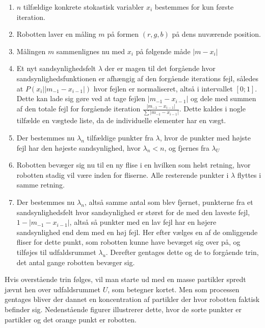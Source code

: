 \documentclass[../../SRP.tex]{subfiles}
\begin{document}
\begin{enumerate}
  \item $n$ tilfældige konkrete stokastisk variabler $x_i$ bestemmes for kun første iteration.

  \item Robotten laver en måling $m$ på formen $(r,g,b)$ på dens nuværende position.

  \item Målingen $m$ sammenlignes nu med $x_i$ på følgende måde $|m - x_i|$

  \item Et nyt sandsynlighedsfelt $\lambda$ der er magen til det forgående hvor sandsynlighedsfunktionen er afhængig af den forgående iterations fejl, således at $P(x_i | |m_{-1} - x_{i-1}|)$ hvor fejlen er normaliseret, altså i intervallet $[0;1]$. Dette kan lade sig gøre ved at tage fejlen $|m_{-1} - x_{i-1}|$ og dele med summen af den totale fejl for forgående iteration $\frac{|m_{-1} - x_{i-1}|}{\sum |m_{-1} - x_{i-1}|}$. Dette kaldes i nogle tilfælde en vægtede liste, da de individuelle elementer har en vægt. 

  \item Der bestemmes nu $\lambda_n$ tilfældige punkter fra $\lambda$, hvor de punkter med højste fejl har den højeste sandsynlighed, hvor $\lambda_n < n$, og fjernes fra $\lambda_U$

  \item Robotten bevæger sig nu til en ny flise i en hvilken som helst retning, hvor robotten stadig vil være inden for fliserne. Alle resterende punkter i $\lambda$ flyttes i samme retning.

  \item Der bestemmes nu $\lambda_n$, altså samme antal som blev fjernet, punkterne fra et sandsynlighedsfelt hvor sandsynlighed er størst for de med den laveste fejl, $1-|m_{-1} - x_{i-1}|$, altså så punkter med en lav fejl har en højere sandsynlighed end dem med en høj fejl. Her efter vælges en af de omliggende fliser for dette punkt, som robotten kunne have bevæget sig over på, og tilføjes til udfaldsrummet $\lambda_u$. Derefter gentages dette og de to forgående trin, det antal gange robotten bevæger sig.
\end{enumerate}
Hvis overstående trin følges, vil man starte ud med en masse partikler spredt jævnt hen over udfaldsrummet $U$, som betegner kortet. Men som processen gentages bliver der dannet en koncentration af partikler der hvor robotten faktisk befinder sig. Nedenstående figurer illustrerer dette, hvor de sorte punkter er partikler og det orange punkt er robotten.
\end{document}
